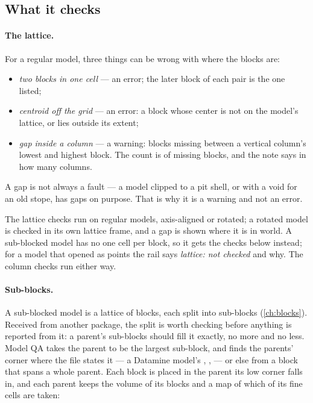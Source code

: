 \subsection{What it checks}

\paragraph{The lattice.} For a regular model, three things can be wrong with where the blocks are:

\begin{itemize}
\item \emph{two blocks in one cell} — an error; the later block of each pair is the one listed;
\item \emph{centroid off the grid} — an error: a block whose center is not on the model's lattice, or lies outside its extent;
\item \emph{gap inside a column} — a warning: blocks missing between a vertical column's lowest and highest block. The count is of missing blocks, and the note says in how many columns.
\end{itemize}

A gap is not always a fault — a model clipped to a pit shell, or with a void for an old stope, has gaps on purpose. That is why it is a warning and not an error.

The lattice checks run on regular models, axis-aligned or rotated; a rotated model is checked in its own lattice frame, and a gap is shown where it is in world. A sub-blocked model has no one cell per block, so it gets the checks below instead; for a model that opened as points the rail says \emph{lattice: not checked} and why. The column checks run either way.

\paragraph{Sub-blocks.}\label{sec:qa-subblocks} A sub-blocked model is a lattice of  blocks, each split into sub-blocks (\cref{ch:blocks}). Received from another package, the split is worth checking before anything is reported from it: a parent's sub-blocks should fill it exactly, no more and no less. Model QA takes the parent to be the largest sub-block, and finds the parents' corner where the file states it — a Datamine model's , ,  — or else from a block that spans a whole parent. Each block is placed in the parent its low corner falls in, and each parent keeps the volume of its blocks and a map of which of its fine cells are taken:

